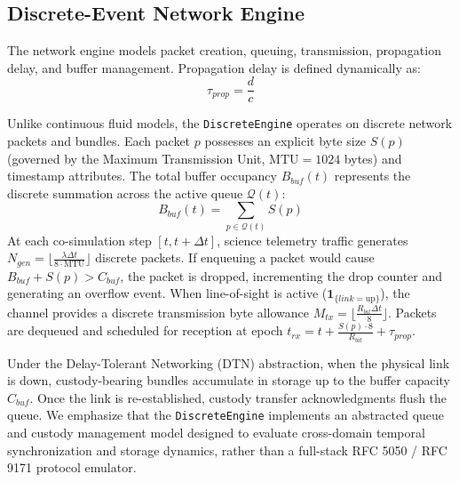 \documentclass[a4paper,fleqn]{cas-sc}
\begin{document}
\subsection{Discrete-Event Network Engine}
The network engine models packet creation, queuing, transmission, propagation delay, and buffer management. Propagation delay is defined dynamically as:
\begin{equation}
    \tau_{prop} = \frac{d}{c}
    \label{eq:propagation_delay}
\end{equation}

Unlike continuous fluid models, the \texttt{DiscreteEngine} operates on discrete network packets and bundles. Each packet $p$ possesses an explicit byte size $S(p)$ (governed by the Maximum Transmission Unit, $\text{MTU} = 1024$ bytes) and timestamp attributes. The total buffer occupancy $B_{buf}(t)$ represents the discrete summation across the active queue $\mathcal{Q}(t)$:
\begin{equation}
    B_{buf}(t) = \sum_{p \in \mathcal{Q}(t)} S(p)
    \label{eq:buffer_discrete}
\end{equation}
At each co-simulation step $[t, t + \Delta t]$, science telemetry traffic generates $N_{gen} = \lfloor \frac{\lambda \Delta t}{8 \cdot \text{MTU}} \rfloor$ discrete packets. If enqueuing a packet would cause $B_{buf} + S(p) > C_{buf}$, the packet is dropped, incrementing the drop counter and generating an overflow event. When line-of-sight is active ($\mathbf{1}_{\{link = \text{up}\}}$), the channel provides a discrete transmission byte allowance $M_{tx} = \lfloor \frac{R_{bit} \Delta t}{8} \rfloor$. Packets are dequeued and scheduled for reception at epoch $t_{rx} = t + \frac{S(p) \cdot 8}{R_{bit}} + \tau_{prop}$. 

Under the Delay-Tolerant Networking (DTN) abstraction, when the physical link is down, custody-bearing bundles accumulate in storage up to the buffer capacity $C_{buf}$. Once the link is re-established, custody transfer acknowledgments flush the queue. We emphasize that the \texttt{DiscreteEngine} implements an abstracted queue and custody management model designed to evaluate cross-domain temporal synchronization and storage dynamics, rather than a full-stack RFC 5050 / RFC 9171 protocol emulator.
\end{document}

